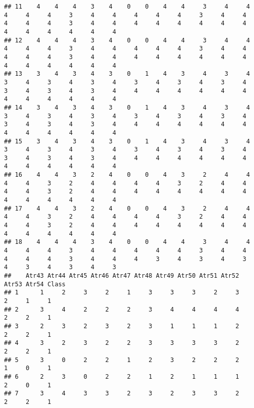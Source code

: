 \documentclass[
]{article}
\begin{document}
\begin{verbatim}
## 11    4    4    4    3    4    0    0    4    4     3     4     4     4     4     4     3     4     4     4     4     4     3     4     4     4     4     4     3     4     4     4     4     4     4     4     4     4     4     4     4     4     4
## 12    4    4    4    3    4    0    0    4    4     3     4     4     4     4     4     3     4     4     4     4     4     3     4     4     4     4     4     3     4     4     4     4     4     4     4     4     4     4     4     4     4     4
## 13    3    4    3    4    3    0    1    4    3     4     3     4     3     4     3     4     3     4     3     4     3     4     3     4     3     4     3     4     3     4     4     4     4     4     4     4     4     4     4     4     4     4
## 14    3    4    3    4    3    0    1    4    3     4     3     4     3     4     3     4     3     4     3     4     3     4     3     4     3     4     3     4     3     4     4     4     4     4     4     4     4     4     4     4     4     4
## 15    3    4    3    4    3    0    1    4    3     4     3     4     3     4     3     4     3     4     3     4     3     4     3     4     3     4     3     4     3     4     4     4     4     4     4     4     4     4     4     4     4     4
## 16    4    4    3    2    4    0    0    4    3     2     4     4     4     4     3     2     4     4     4     4     3     2     4     4     4     4     3     2     4     4     4     4     4     4     4     4     4     4     4     4     4     4
## 17    4    4    3    2    4    0    0    4    3     2     4     4     4     4     3     2     4     4     4     4     3     2     4     4     4     4     3     2     4     4     4     4     4     4     4     4     4     4     4     4     4     4
## 18    4    4    4    3    4    0    0    4    4     3     4     4     4     4     4     3     4     4     4     4     4     3     4     4     4     4     4     3     4     4     4     3     4     3     4     3     4     3     4     3     4     3
##    Atr43 Atr44 Atr45 Atr46 Atr47 Atr48 Atr49 Atr50 Atr51 Atr52 Atr53 Atr54 Class
## 1      1     2     3     2     1     3     3     3     2     3     2     1     1
## 2      3     4     2     2     2     3     4     4     4     4     2     2     1
## 3      2     3     2     3     2     3     1     1     1     2     2     2     1
## 4      3     2     3     2     2     3     3     3     3     2     2     2     1
## 5      3     0     2     2     1     2     3     2     2     2     1     0     1
## 6      2     3     0     2     2     1     2     1     1     1     2     0     1
## 7      3     4     3     3     2     3     2     3     3     2     2     2     1

\end{verbatim}
\end{document}

